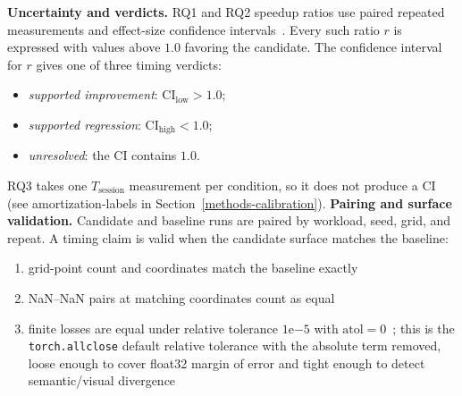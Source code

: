 \textbf{Uncertainty and verdicts.} RQ1 and RQ2 speedup
ratios use paired repeated measurements and effect-size
confidence
intervals~\cite{kalibera2013rigorous,kalibera2020effect}.
Every such ratio $r$ is expressed with values above $1.0$
favoring the candidate. The confidence interval for $r$
gives one of three timing verdicts:
\begin{itemize}\tightlist
  \item \emph{supported improvement}: CI$_{\text{low}}>1.0$;
  \item \emph{supported regression}: CI$_{\text{high}}<1.0$;
  \item \emph{unresolved}: the CI contains $1.0$.
\end{itemize}
RQ3 takes one $T_{\text{session}}$ measurement per
condition, so it does not produce a CI (see amortization-labels in
Section~\ref{methods-calibration}).
\textbf{Pairing and surface validation.} Candidate and baseline
runs are paired by workload, seed, grid, and repeat. A timing
claim is valid when the candidate surface matches the
baseline:
\begin{enumerate}
\item grid-point count and coordinates match the baseline
exactly
\item NaN–NaN pairs at matching coordinates count as equal
\item finite losses are equal under relative tolerance
$1\mathrm{e}{-5}$ with $\text{atol}=0$~\cite{pytorch_allclose};
this is the \texttt{torch.allclose} default relative tolerance
with the absolute term removed, loose enough to cover float32
margin of error and tight enough to detect semantic/visual
divergence
\end{enumerate}
